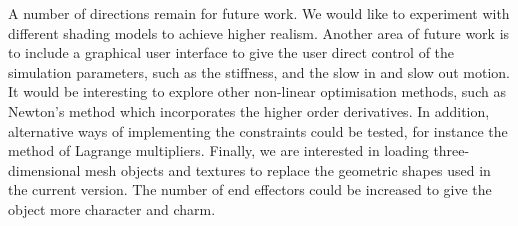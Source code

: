 \documentclass[paper=a4, fontsize=11pt]{scrartcl} %
\numberwithin{equation}{section} %
\numberwithin{figure}{section} %
\numberwithin{table}{section} %
\begin{document}
A number of directions remain for future work. We would like to experiment with different shading models to achieve higher realism. Another area of future work is to include a graphical user interface to give the user direct control of the simulation  parameters, such as the stiffness, and the slow in and slow out motion. It would be interesting to explore other non-linear optimisation methods, such as Newton's method which incorporates the higher order derivatives. In addition,  alternative ways of implementing the constraints could be tested, for instance the method of Lagrange multipliers. Finally, we are interested in loading three-dimensional mesh objects and textures to replace the geometric shapes used in the current version. The number of end effectors could be increased to give the object more character and charm. 

\nocite{Fedor2003}
\nocite{Welman1993}
\nocite{Crai55}
{}

\end{document}
